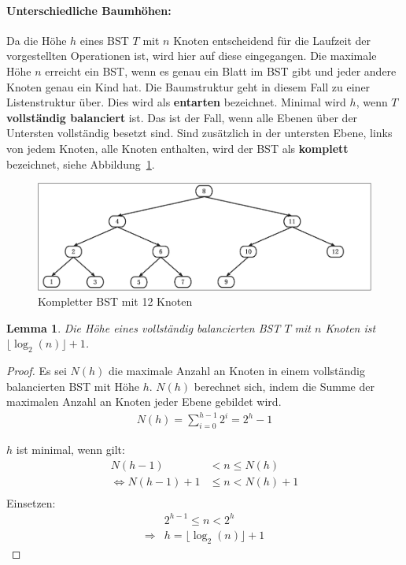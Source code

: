 \documentclass[a4paper,12pt]{article}
\newtheorem{Lemma}{Lemma}[section]
\begin{document}
\paragraph{Unterschiedliche Baumhöhen:}
Da die Höhe $h$ eines BST $T$ mit $n$ Knoten entscheidend für die Laufzeit der vorgestellten Operationen ist, wird hier auf diese eingegangen. Die maximale Höhe $n$ erreicht ein BST, wenn es genau ein Blatt im BST gibt und jeder andere Knoten genau ein Kind hat. Die Baumstruktur geht in diesem Fall zu einer Listenstruktur über. Dies wird als \textbf{entarten} bezeichnet. Minimal wird $h$, wenn $T$ \textbf{vollständig balanciert} ist. Das ist der Fall, wenn alle Ebenen über der Untersten vollständig besetzt sind. Sind zusätzlich in der untersten Ebene, links von jedem Knoten, alle Knoten enthalten, wird der BST als \textbf{komplett} bezeichnet, siehe \mbox{Abbildung \ref{fig:kompletterBaum}}. 
\begin{figure}[H]
	\centering
	\includegraphics[width= 1\textwidth]{"Medien/Einleitung/kompletterBaum"}
	\caption{Kompletter BST mit 12 Knoten}
	\label{fig:kompletterBaum}
\end{figure}


\begin{Lemma} Die Höhe eines vollständig balancierten BST $T$ mit $n$ Knoten ist $ \lfloor \log_2{(n)} \rfloor + 1 $. 
\end{Lemma}
\begin{proof}
	
	Es sei $\mathit{N(h)}$ die maximale Anzahl an Knoten in einem vollständig balancierten BST mit Höhe $h$.
	$\mathit{N(h)}$  berechnet sich, indem die Summe der maximalen Anzahl an Knoten jeder Ebene gebildet wird.\\
	\begin{align*}
	\mathit{N(h)} = \sum\limits_{i=0}^{h-1} 2^i = 2^h - 1 
	\end{align*}
	
	\noindent	$h$ ist minimal, wenn gilt:\\
	\begin{align*}
	\mathit{N(h-1)} &< n \leq \mathit{N(h)}\\
	\Leftrightarrow \mathit{N(h-1)} + 1 &\leq n < \mathit{N(h)} + 1\\
	\end{align*}
	Einsetzen:\\
	\begin{align*}
	&2^{h - 1} \leq n < 2^h\\
	\Rightarrow & h =  \lfloor \log_2{(n)} \rfloor + 1
	\end{align*}
	
\end{proof}
\end{document}
